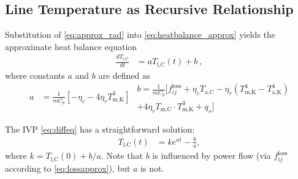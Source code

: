 \documentclass[journal,twoside]{IEEEtran}
\begin{document}
\subsection{Line Temperature as Recursive Relationship}
Substitution of \eqref{eq:approx_rad} into \eqref{eq:heatbalance_approx} yields the approximate heat balance equation
\begin{align}\label{eq:diffeq}
\frac{dT_\text{l,C}}{dt} &= aT_\text{l,C}(t) + b~,
\end{align}
where constants $a$ and $b$ are defined as
\begin{subequations}
\begin{align}
a &= \frac{1}{mC_p} \left[ -\eta_c - 4\eta_rT_\text{m,K}^3 \right]
\end{align}
\begin{multline}
b = \frac{1}{mC_p} \big[ f_{ij}^\text{loss} + \eta_cT_\text{a,C} - \eta_r \left( T_\text{m,K}^4 - T_\text{a,K}^4 \right) \\ + 4\eta_rT_\text{m,C}\cdot T_\text{m,K}^3 + q_s \big]
\end{multline}
\end{subequations}

The IVP \eqref{eq:diffeq} has a straightforward solution:
\begin{align}\label{eq:tivp}
T_\text{l,C}(t) &= ke^{at} - \frac{b}{a},
\end{align}
where $k=T_\text{l,C}(0) + b/a$. Note that $b$ is influenced by power flow (via
$f_{ij}^\text{loss}$ according to \eqref{eq:lossapprox}), but $a$ is not.
\end{document}
